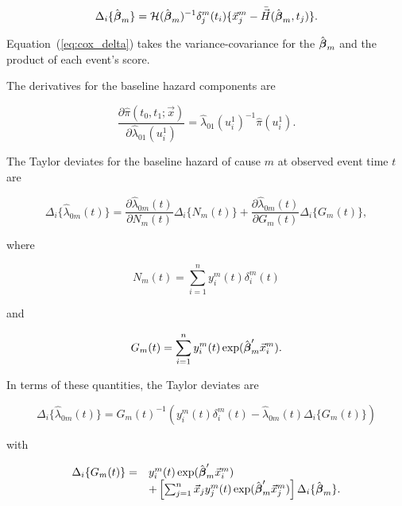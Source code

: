 \documentclass[11pt]{article}
\newcommand{\bbeta}{\mbox{\boldmath$\beta$}}
\begin{document}
\begin{equation}
\Delta_{i} \lbrace {\hat{\bbeta}_{m}} \rbrace= \mathcal{H}({\hat{\bbeta}_{m}} )^{-1} 
\delta^{m}_{j} (t_{i}) \lbrace \vec{x}^{m}_{j} - \bar{\vec{H}}(\hat{\bbeta}_{m},t_{j}) \rbrace.
\label{eq:cox_delta}
\end{equation}

\noindent Equation~(\ref{eq:cox_delta})  takes the variance-covariance for the $\hat{\bbeta}_{m}$ and the product of each event's score.

The derivatives for the baseline hazard components are

\begin{equation}
\frac{\partial \hat{\pi}(t_0,t_1; \vec{x})}{\partial \hat{\lambda}_{01}(u^1_i)} = \hat{\lambda}_{01}(u^1_i)^{-1} \hat{\pi}(u^1_i).
\label{eq:dot_haz_semi}
\end{equation}

\noindent The Taylor deviates for the baseline hazard of cause $m$ at observed event time $t$ are

\begin{equation}
\Delta_{i} \lbrace \hat{\lambda}_{0m} (t) \rbrace = \frac{\partial \hat{\lambda}_{0m} (t)}{\partial N_m(t)} \Delta_{i} \lbrace N_m(t) \rbrace + \frac{\partial \hat{\lambda}_{0m} (t)}{\partial G_m(t)} \Delta_{i} \lbrace G_m(t) \rbrace,
\end{equation}

\noindent where

\[
N_m(t) = \sum_{i=1}^n  y^m_{i}(t) \delta^m_i(t)
\]

\noindent and

\[
G_m(t) = \sum_{i=1}^n  y^m_{i}(t)  \exp ( \hat{\bbeta}_m' \vec{x}^m_{i} ). 
\]

\noindent In terms of these quantities, the Taylor deviates are

\begin{equation}
\Delta_{i} \lbrace \hat{\lambda}_{0m} (t) \rbrace = G_m(t)^{-1} ( y^m_{i}(t) \delta^m_i(t) - \hat{\lambda}_{0m}(t) \Delta_{i} \lbrace G_m(t) \rbrace) 
\end{equation}

\noindent with

\[
\begin{array}{ll}
\Delta_{i} \lbrace G_m(t) \rbrace =&  y^m_{i}(t) \exp ( \hat{\bbeta}_m' \vec{x}^m_{i} ) \\ 
&+ \left[ \sum_{{j}=1}^{n} \vec{x}_j y^m_j(t) \exp ( \hat{\bbeta}_m' \vec{x}^m_{j} ) \right] \Delta_{i} \lbrace \hat{\bbeta}_{m} \rbrace.
\end{array}
\]
\end{document}

